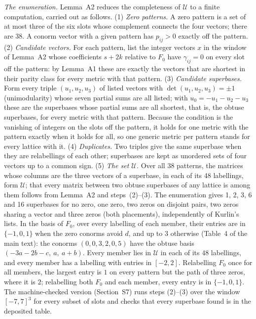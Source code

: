 \documentclass[preprint,pdf]{iucr}          %
\begin{document}
\emph{The enumeration.} Lemma~A2 reduces the completeness of $\mathcal U$ to a finite computation, carried out as follows. (1) \emph{Zero patterns.} A zero pattern is a set of at most three of the six slots whose complement connects the four vectors; there are 38. A conorm vector with a given pattern has $p_{ij}>0$ exactly off the pattern. (2) \emph{Candidate vectors.} For each pattern, list the integer vectors $x$ in the window of Lemma~A2 whose coefficients $s+2k$ relative to $F_0$ have $\gamma_{ij}=0$ on every slot off the pattern: by Lemma~A1 these are exactly the vectors that are shortest in their parity class for every metric with that pattern. (3) \emph{Candidate superbases.} Form every triple $(u_1,u_2,u_3)$ of listed vectors with $\det(u_1,u_2,u_3)=\pm1$ (unimodularity) whose seven partial sums are all listed; with $u_0=-u_1-u_2-u_3$ these are the superbases whose partial sums are all shortest, that is, the obtuse superbases, for every metric with that pattern. Because the condition is the vanishing of integers on the slots off the pattern, it holds for one metric with the pattern exactly when it holds for all, so one generic metric per pattern stands for every lattice with it. (4) \emph{Duplicates.} Two triples give the same superbase when they are relabellings of each other; superbases are kept as unordered sets of four vectors up to a common sign. (5) \emph{The set $\mathcal U$.} Over all 38 patterns, the matrices whose columns are the three vectors of a superbase, in each of its 48 labellings, form $\mathcal U$; that every matrix between two obtuse superbases of any lattice is among them follows from Lemma~A2 and steps~(2)--(3). The enumeration gives 1, 2, 3, 6 and 16 superbases for no zero, one zero, two zeros on disjoint pairs, two zeros sharing a vector and three zeros (both placements), independently of Kurlin's lists. In the basis of $F_0$, over every labelling of each member, their entries are in $\{-1,0,1\}$ when the zero conorms avoid $d$, and up to $3$ otherwise (Table~4 of the main text): the conorms $(0,0,3,2,0,5)$ have the obtuse basis $(-3a-2b-c,\ a,\ a+b)$. Every member lies in $\mathcal U$ in each of its 48 labellings, and every member has a labelling with entries in $[-2,2]$. Relabelling $F_0$ once for all members, the largest entry is $1$ on every pattern but the path of three zeros, where it is $2$; relabelling both $F_0$ and each member, every entry is in $\{-1,0,1\}$. The machine-checked version (Section~S7) runs steps (2)--(3) over the window $[-7,7]^3$ for every subset of slots and checks that every superbase found is in the deposited table.
\end{document}
